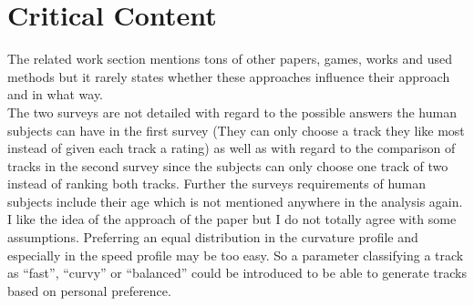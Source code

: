 \documentclass[oneside, notitlepage, twocolumn]{scrartcl}
\begin{document}
\section{Critical Content}
The related work section mentions tons of other papers, games, works and used methods but it rarely states whether these approaches influence their approach and in what way.\\
The two surveys are not detailed with regard to the possible answers the human subjects can have in the first survey (They can only choose a track they like most instead of given each track a rating) as well as with regard to the comparison of tracks in the second survey since the subjects can only choose one track of two instead of ranking both tracks.
Further the surveys requirements of human subjects include their age which is not mentioned anywhere in the analysis again.\\
I like the idea of the approach of the paper but I do not totally agree with some assumptions.
Preferring an equal distribution in the curvature profile and especially in the speed profile may be too easy.
So a parameter classifying a track as ``fast'', ``curvy'' or ``balanced'' could be introduced to be able to generate tracks based on personal preference.
\end{document}
